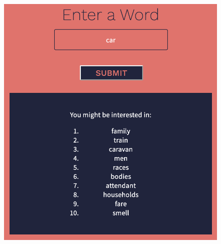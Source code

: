 \documentclass[11pt]{article}
\begin{document}
\begin{figure}[H]
\includegraphics[scale = 0.56]{18_5}
\centering
\end{figure}
\end{document}
